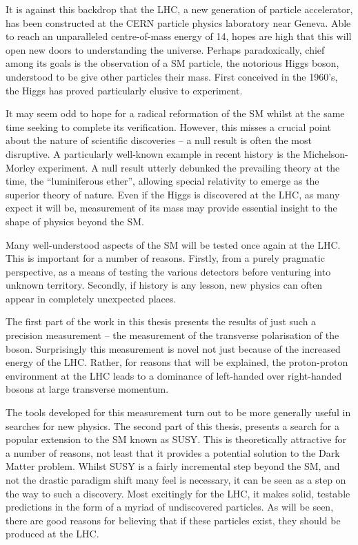 It is against this backdrop that the \ac{LHC}, a new generation of particle
accelerator, has been constructed at the \ac{CERN} particle physics laboratory
near Geneva. Able to reach an unparalleled centre-of-mass energy of
\unit{14}{\TeV}, hopes are high that this will open new doors to understanding
the universe. Perhaps paradoxically, chief among its goals is the observation of
a \ac{SM} particle, the notorious Higgs boson, understood to be give other
particles their mass. First conceived in the 1960's, the Higgs has proved
particularly elusive to experiment.

It may seem odd to hope for a radical reformation of the \ac{SM} whilst at the
same time seeking to complete its verification. However, this misses a crucial
point about the nature of scientific discoveries -- a null result is often the
most disruptive. A particularly well-known example in recent history is the
Michelson-Morley experiment. A null result utterly debunked the prevailing
theory at the time, the ``luminiferous ether'', allowing special relativity to
emerge as the superior theory of nature. Even if the Higgs is discovered at the
\ac{LHC}, as many expect it will be, measurement of its mass may provide
essential insight to the shape of physics beyond the \ac{SM}.

Many well-understood aspects of the \ac{SM} will be tested once again at the
\ac{LHC}. This is important for a number of reasons. Firstly, from a purely
pragmatic perspective, as a means of testing the various detectors before
venturing into unknown territory. Secondly, if history is any lesson, new
physics can often appear in completely unexpected places.

The first part of the work in this thesis presents the results of just such a
precision measurement -- the measurement of the transverse polarisation of the
\PW boson. Surprisingly this measurement is novel not just because of the
increased energy of the \ac{LHC}. Rather, for reasons that will be explained,
the proton-proton environment at the \ac{LHC} leads to a dominance of
left-handed over right-handed \PW bosons at large transverse momentum.

The tools developed for this measurement turn out to be more generally useful in
searches for new physics. The second part of this thesis, presents a search for
a popular extension to the \ac{SM} known as \acl{SUSY}. This is theoretically
attractive for a number of reasons, not least that it provides a potential
solution to the Dark Matter problem. Whilst \ac{SUSY} is a fairly incremental
step beyond the \ac{SM}, and not the drastic paradigm shift many feel is
necessary, it can be seen as a step on the way to such a discovery. Most
excitingly for the \ac{LHC}, it makes solid, testable predictions in the form of
a myriad of undiscovered particles. As will be seen, there are good reasons for
believing that if these particles exist, they should be produced at the
\ac{LHC}.

